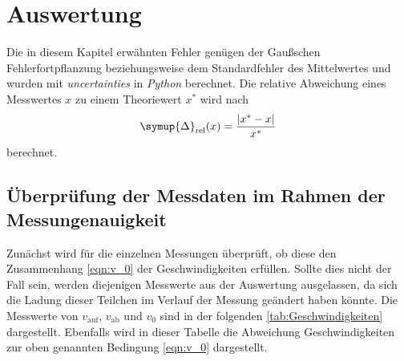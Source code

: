 \section{Auswertung}
\label{sec:Auswertung}
Die in diesem Kapitel erwähnten Fehler genügen der Gaußschen Fehlerfortpflanzung beziehungsweise dem Standardfehler des Mittelwertes und wurden mit \textit{uncertainties}
\cite{uncertainties} in \textit{Python} berechnet. Die relative Abweichung eines Messwertes $x$ zu einem Theoriewert $x^*$ wird nach 
\begin{equation}
  \label{eqn:Delta_rel}
  \symup{\Delta}_\text{rel}(x) = \frac{|x^* - x|}{x^*}
\end{equation}
berechnet.
\subsection{Überprüfung der Messdaten im Rahmen der Messungenauigkeit}
\label{subsec:bedingung}
Zunächst wird für die einzelnen Messungen überprüft, ob diese den Zusammenhang \eqref{eqn:v_0} der Geschwindigkeiten erfüllen. 
Sollte dies nicht der Fall sein, werden diejenigen Messwerte aus der 
Auswertung ausgelassen, da sich die Ladung dieser Teilchen im Verlauf der Messung geändert haben könnte. Die Messwerte von $v_{\text{auf}}$, $v_{\text{ab}}$ und $v_0$ 
sind in der folgenden \autoref{tab:Geschwindigkeiten} dargestellt. Ebenfalls wird in dieser Tabelle die Abweichung Geschwindigkeiten zur oben genannten Bedingung
\eqref{eqn:v_0} dargestellt.

